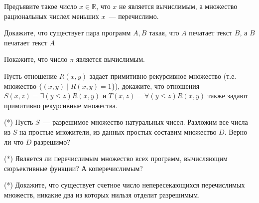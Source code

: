 \setcounter{curtask}{1}


\begin{task}
    Предъявите такое число $x \in \mathbb{R}$, что $x$ не является
    вычислимым, а множество рациональных числел меньших $x$~---
    перечислимо.
\end{task}

\begin{task}
    Докажите, что существует пара программ $A, B$ такая, что $A$
    печатает текст $B$, а $B$ печатает текст $A$
\end{task}

\begin{task}
    Покажите, что число $\pi$ является вычислимым.
\end{task}

\begin{task}
    Пусть отношение $R(x, y)$ задает примитивно рекурсивное множество
    (т.е. множество $\{(x, y) \mid R(x, y) = 1\}$), докажите, что
    отношения $S(x, z) = \exists (y \le z) R(x, y)$ и
    $T(x, z) = \forall (y \le z) R(x, y)$ также задают примитивно
    рекурсивные множества.
\end{task}


\breakline

\begin{task}(*)
    Пусть $S$~--- разрешимое множество натуральных чисел. Разложим все
    числа из $S$ на простые множители, из данных простых составим
    множество $D$. Верно ли что $D$ разрешимо?
\end{task}

\begin{task}(*)
    Является ли перечислимым множество всех программ, вычисляющим
    сюръективные функции? А коперечислимым?
\end{task}

\begin{task}(*)
    Докажите, что существует счетное число непересекающихся
    перечислимых множеств, никакие два из которых нильзя отделит
    разрешимым.
\end{task}